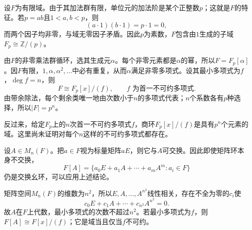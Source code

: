 \begin{example}
设$F$为有限域。由于其加法群有限，单位元的加法阶是某个正整数$p$；这就是$F$的特征。若$p=ab$且$1<a,b<p$，则
\[
(a\cdot1)(b\cdot1)=p\cdot1=0,
\]
而两个因子均非零，与域无零因子矛盾。因此$p$为素数，$F$包含由$1$生成的子域$F_p\cong\mathbb Z/(p)$。

由$F$的非零乘法群循环，选其生成元$\alpha$。每个非零元素都是$\alpha$的幂，所以$F=F_p[\alpha]$。因$F$有限，$1,\alpha,\alpha^2,\ldots$中必有重复，从而$\alpha$满足非零多项式。设其最小多项式为$f$，$\deg f=n$，则
\[
F\cong F_p[x]/(f),\qquad f\text{ 为首一不可约多项式}.
\]
由带余除法，每个剩余类唯一地由次数小于$n$的多项式代表；$n$个系数各有$p$种选择，所以$|F|=p^n$。

反过来，给定$F_p$上的$n$次首一不可约多项式$f$，商环$F_p[x]/(f)$是具有$p^n$个元素的域。这里尚未证明对每个$n$这样的不可约多项式都存在。
\end{example}

\begin{example}
设$A\in M_n(F)$。把$a\in F$视为标量矩阵$aE$，则它与$A$可交换。因此即使矩阵环本身不交换，
\[
F[A]=\{a_0E+a_1A+\cdots+a_mA^m:a_i\in F\}
\]
仍是交换幺环，可以应用上述结论。

矩阵空间$M_n(F)$的维数为$n^2$，所以$E,A,\ldots,A^{n^2}$线性相关，存在不全为零的$c_i$使
\[
c_0E+c_1A+\cdots+c_{n^2}A^{n^2}=0.
\]
故$A$在$F$上代数，最小多项式的次数不超过$n^2$。若最小多项式为$f$，则$F[A]\cong F[x]/(f)$；它是域当且仅当$f$不可约。
\end{example}

